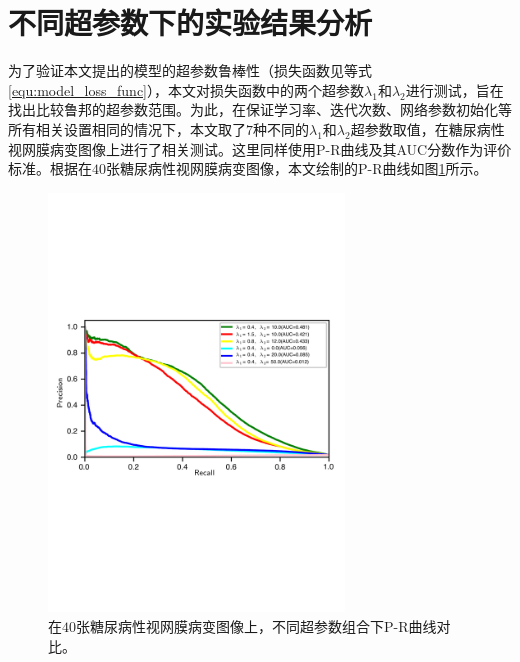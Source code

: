 
\section{不同超参数下的实验结果分析}\label{sec:hyper_paras}
为了验证本文提出的模型的超参数鲁棒性（损失函数见等式\ref{equ:model_loss_func}），本文对损失函数中的两个超参数$\lambda_{1}$和$\lambda_{2}$进行测试，旨在找出比较鲁邦的超参数范围。为此，在保证学习率、迭代次数、网络参数初始化等所有相关设置相同的情况下，本文取了$7$种不同的$\lambda_{1}$和$\lambda_{2}$超参数取值，在糖尿病性视网膜病变图像上进行了相关测试。这里同样使用P-R曲线及其AUC分数作为评价标准。根据在$40$张糖尿病性视网膜病变图像，本文绘制的P-R曲线如图\ref{fig:pr_curve_retinal_hyper_paras}所示。
\begin{figure}[h]
	\centering
	\includegraphics[width=0.7\textwidth]{figure/pr_curve_retinal_hyper_paras/pr_curve.pdf}
	\caption[不同超参数组合下P-R曲线对比]{在$40$张糖尿病性视网膜病变图像上，不同超参数组合下P-R曲线对比。}
	\label{fig:pr_curve_retinal_hyper_paras}
\end{figure}

